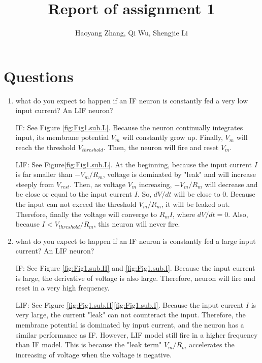 \documentclass[11pt]{article}
\title{Report of assignment 1}
\author{Haoyang Zhang, Qi Wu, Shengjie Li}
\begin{document}
\maketitle

	\section*{Questions}
	\begin{enumerate}
		\item what do you expect to happen if an IF neuron is constantly fed a very low input current? An LIF neuron?
		
		IF: See Figure \ref{fig:Fig1.sub.L}. Because the neuron continually integrates input, its membrane potential $V_m$ will constantly grow up. Finally, $V_m$ will reach the threshold $V_{threshold}$. Then, the neuron will fire and reset $V_m$.
		
		LIF: See Figure\ref{fig:Fig1.sub.L}. At the beginning, because the input current $I$ is far smaller than $-V_m/R_m$, voltage is dominated by "leak" and will increase steeply from $V_{rest}$. Then, as voltage $V_m$ increasing, $-V_m/R_m$ will decrease and be close or equal to the input current $I$. So, $dV/dt$ will be close to 0. Because the input can not exceed the threshold $V_m/R_m$, it will be leaked out. Therefore, finally the voltage will converge to $R_mI$, where $dV/dt = 0$. Also, because $I < V_{threshold}/R_m$, this neuron will never fire.
		
		\item what do you expect to happen if an IF neuron is constantly fed a large input current? An LIF neuron?
			
		IF: See Figure \ref{fig:Fig1.sub.H} and \ref{fig:Fig1.sub.I}. Because the input current is large, the derivative of voltage is also large. Therefore, neuron will fire and reset in a very high frequency.
		
		LIF: See Figure \ref{fig:Fig1.sub.H}\ref{fig:Fig1.sub.I}. Because the input current $I$ is very large, the current "leak" can not counteract the input. Therefore, the membrane potential is dominated by input current, and the neuron has a similar performance as IF. However, LIF model still fire in a higher frequency than IF model. This is because the "leak term" $V_m/R_m$ accelerates the increasing of voltage when the voltage is negative.
				

\end{enumerate}
\end{document}
